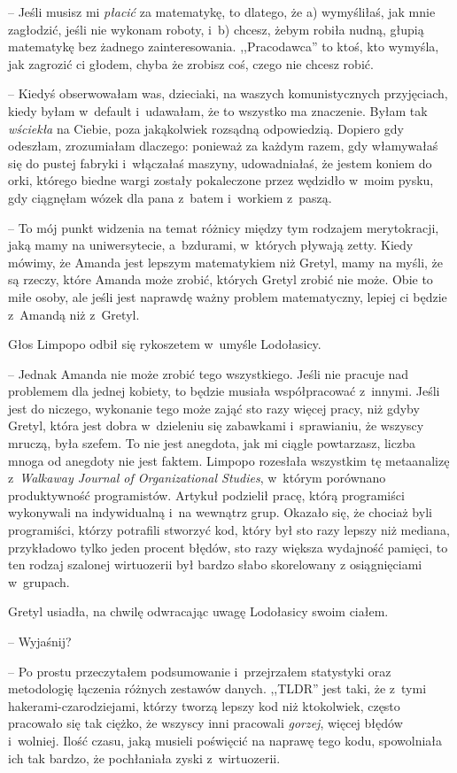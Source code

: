 \documentclass[oneside,polish,11pt,sfheadings]{mwbk}
\begin{document}
-- Jeśli musisz mi \textit{płacić} za matematykę, to dlatego, że a)
wymyśliłaś, jak mnie zagłodzić, jeśli nie wykonam roboty, i~b) chcesz,
żebym robiła nudną, głupią matematykę bez żadnego zainteresowania.
,,Pracodawca'' to ktoś, kto wymyśla, jak zagrozić ci głodem, chyba że
zrobisz coś, czego nie chcesz robić.

-- Kiedyś obserwowałam was, dzieciaki, na waszych komunistycznych
przyjęciach, kiedy byłam w~default i~udawałam, że to wszystko ma
znaczenie. Byłam tak \textit{wściekła} na Ciebie, poza jakąkolwiek
rozsądną odpowiedzią. Dopiero gdy odeszłam, zrozumiałam dlaczego:
ponieważ za każdym razem, gdy włamywałaś się do pustej fabryki i~włączałaś maszyny, udowadniałaś, że jestem koniem do orki, którego
biedne wargi zostały pokaleczone przez wędzidło w~moim pysku, gdy
ciągnęłam wózek dla pana z~batem i~workiem z~paszą.

-- To mój punkt widzenia na temat różnicy między tym rodzajem
merytokracji, jaką mamy na uniwersytecie, a~bzdurami, w~których pływają
zetty. Kiedy mówimy, że Amanda jest lepszym matematykiem niż Gretyl,
mamy na myśli, że są rzeczy, które Amanda może zrobić, których Gretyl
zrobić nie może. Obie to miłe osoby, ale jeśli jest naprawdę ważny
problem matematyczny, lepiej ci będzie z~Amandą niż z~Gretyl.

Głos Limpopo odbił się rykoszetem w~umyśle Lodołasicy. 

-- Jednak Amanda
nie może zrobić tego wszystkiego. Jeśli nie pracuje nad problemem dla
jednej kobiety, to będzie musiała współpracować z~innymi. Jeśli jest do
niczego, wykonanie tego może zająć sto razy więcej pracy, niż gdyby
Gretyl, która jest dobra w~dzieleniu się zabawkami i~sprawianiu, że
wszyscy mruczą, była szefem. To nie jest anegdota, jak mi ciągle
powtarzasz, liczba mnoga od anegdoty nie jest faktem. Limpopo rozesłała
wszystkim tę metaanalizę z~\textit{Walkaway Journal of Organizational
Studies}, w~którym porównano produktywność programistów. Artykuł
podzielił pracę, którą programiści wykonywali na indywidualną i~na
wewnątrz grup. Okazało się, że chociaż byli programiści, którzy
potrafili stworzyć kod, który był sto razy lepszy niż mediana,
przykładowo tylko jeden procent błędów, sto razy większa wydajność
pamięci, to ten rodzaj szalonej wirtuozerii był bardzo słabo skorelowany
z osiągnięciami w~grupach.

Gretyl usiadła, na chwilę odwracając uwagę Lodołasicy swoim ciałem. 

-- Wyjaśnij?

-- Po prostu przeczytałem podsumowanie i~przejrzałem statystyki oraz
metodologię łączenia różnych zestawów danych. ,,TLDR'' jest taki, że z~tymi hakerami-czarodziejami, którzy tworzą lepszy kod niż ktokolwiek,
często pracowało się tak ciężko, że wszyscy inni pracowali
\textit{gorzej}, więcej błędów i~wolniej. Ilość czasu, jaką musieli
poświęcić na naprawę tego kodu, spowolniała ich tak bardzo, że
pochłaniała zyski z~wirtuozerii.
\end{document}

